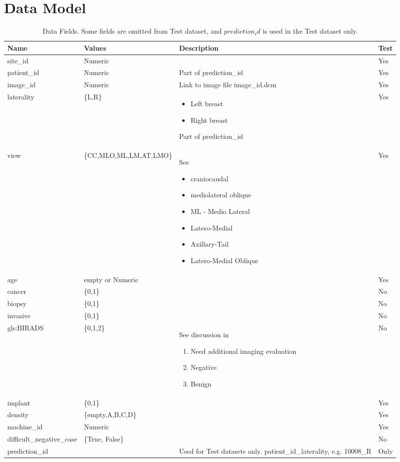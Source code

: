 \documentclass[]{article}
\begin{document}
\section{Data Model}
\begin{table}[H]
	\begin{center}
		\caption[Data Fields]{Data Fields. Some fields are omitted from Test dataset, and $prediction_id$ is used in the Test dataset only.}
		\begin{tabular}{|l|l|p{5cm}|l|}   \hline
			Name&Values&Description&Test\\  \hline
			site\_id&Numeric&&Yes\\  \hline
			patient\_id&Numeric&Part of	prediction\_id&Yes\\  \hline
			image\_id&Numeric&Link to image file image\_id.dcm&Yes\\  \hline
			laterality&\{L,R\}&\begin{itemize}
				\item Left breast
				\item Right breast
			\end{itemize}Part of	prediction\_id&Yes\\  \hline
			view&\{CC,MLO,ML,LM,AT,LMO\}& See \cite{murphy2021mamography,roberts2022mamographic} \begin{itemize}
				\item craniocaudal 
				\item mediolateral oblique
				\item ML - Medio Lateral
				\item Latero-Medial
				\item Axillary-Tail
				\item Latero-Medial Oblique
			\end{itemize}&Yes\\  \hline
			age&empty or Numeric&&Yes\\  \hline
			cancer&\{0,1\}&&No\\  \hline
			biopsy&\{0,1\}&&No\\  \hline
			invasive&\{0,1\}&&No\\  \hline
			\gls{gls:BIRADS}&\{0,1,2\}&See discussion in \cite{pan2022what}\begin{enumerate}[start=0]
				\item Need additional imaging evaluation
				\item Negative
				\item Benign
			\end{enumerate}&No\\  \hline
			implant&\{0,1\}&&Yes\\  \hline
			density&\{empty,A,B,C,D\}&&Yes\\  \hline
			machine\_id&Numeric&&Yes\\  \hline
			difficult\_negative\_case&\{True, False\}&&No\\  \hline
			prediction\_id&&Used for Test datasets only. patient\_id\_laterality, e.g. 10008\_R&Only\\  \hline
		\end{tabular}
	\end{center}
\end{table}
\end{document}
